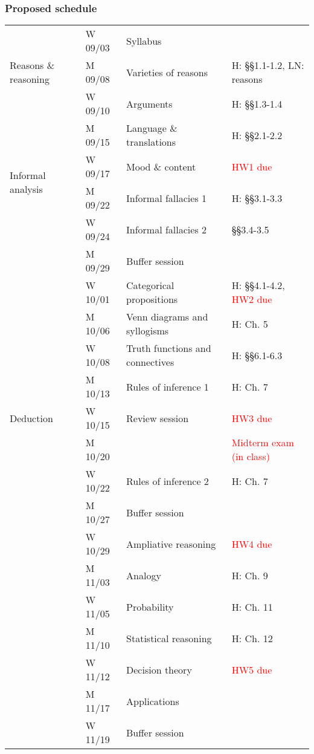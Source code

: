 \documentclass[10pt,letterpaper,xcolor=dvipsnames,handout]{beamer}
\begin{document}
\begin{frame}
\frametitle{Proposed schedule}
\tiny

\begin{tabular}{|l|l|l|l|}
\hline
\multirow{3}{*}{Reasons \& reasoning} 
 & W 09/03 & Syllabus & \\
 & M 09/08 & Varieties of reasons & H: \S\S1.1-1.2, LN: reasons \\
 & W 09/10 & Arguments & H: \S\S1.3-1.4 \\

\hline
\multirow{4}{*}{Informal analysis} 
 & M 09/15 & Language \& translations & H: \S\S2.1-2.2 \\
 & W 09/17 & Mood \& content &	\textcolor{red}{HW1 due} \\
 & M 09/22 & Informal fallacies 1 & H: \S\S3.1-3.3 \\
 & W 09/24 & Informal fallacies 2 & \S\S3.4-3.5\\
 & M 09/29 & Buffer session & \\

\hline
\multirow{9}{*}{Deduction} 
 & W 10/01 & Categorical propositions & H: \S\S4.1-4.2, \textcolor{red}{HW2 due} \\
 & M 10/06 & Venn diagrams and syllogisms & H: Ch. 5 \\
 & W 10/08 & Truth functions and connectives & H: \S\S6.1-6.3 \\
 & M 10/13 & Rules of inference 1 & H: Ch. 7 \\
 
 & W 10/15 & Review session & \textcolor{red}{HW3 due} \\
 & M 10/20 & & \textcolor{red}{Midterm exam (in class)} \\
 
 & W 10/22 & Rules of inference 2 & H: Ch. 7 \\
 & M 10/27 & Buffer session & \\
 
\hline 
\multirow{6}{*}{Induction}  
 & W 10/29 & Ampliative reasoning & \textcolor{red}{HW4 due} \\
 & M 11/03 & Analogy & H: Ch. 9 \\
 & W 11/05 & Probability & H: Ch. 11\\
 & M 11/10 & Statistical reasoning & H: Ch. 12 \\
 & W 11/12 & Decision theory & \textcolor{red}{HW5 due} \\
 & M 11/17 & Applications & \\
 & W 11/19 & Buffer session & \\


\end{tabular}
\end{frame}
\end{document}
